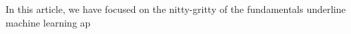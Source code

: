 In this article, we have focused on the nitty-gritty of the fundamentals underline machine learning ap